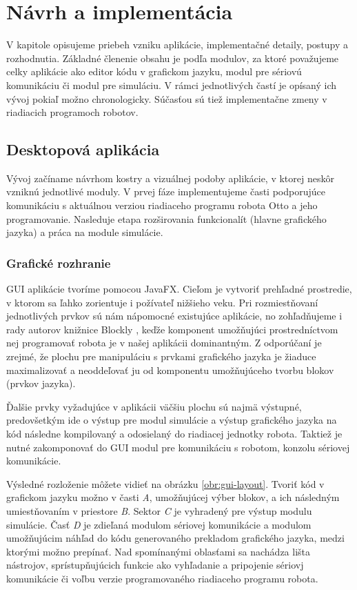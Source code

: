 \chapter{Návrh a implementácia}
\label{kap:implementacia}

V kapitole opisujeme priebeh vzniku aplikácie, implementačné detaily, postupy a rozhodnutia. Základné členenie obsahu je podľa modulov, za ktoré považujeme celky aplikácie ako editor kódu v grafickom jazyku, modul pre sériovú komunikáciu či modul pre simuláciu. V rámci jednotlivých častí je opísaný ich vývoj pokiaľ možno chronologicky. Súčasťou sú tiež implementačne zmeny v riadiacich programoch robotov.

\section{Desktopová aplikácia}
Vývoj začíname návrhom kostry a vizuálnej podoby aplikácie, v ktorej neskôr vzniknú jednotlivé moduly. V prvej fáze implementujeme časti podporujúce komunikáciu s aktuálnou verziou riadiaceho programu robota Otto a jeho programovanie. Nasleduje etapa rozširovania funkcionalít (hlavne grafického jazyka)  a práca na module simulácie.


\subsection{Grafické rozhranie}
GUI aplikácie tvoríme pomocou JavaFX. Cieľom je vytvoriť prehľadné prostredie, v ktorom sa ľahko zorientuje i požívateľ nižšieho veku. Pri rozmiestňovaní jednotlivých prvkov sú nám nápomocné existujúce aplikácie, no zohľadňujeme i rady autorov knižnice Blockly \cite{blocklyBestPractices}, keďže komponent umožňujúci prostredníctvom nej programovať robota je v našej aplikácii dominantným. Z odporúčaní je zrejmé, že plochu pre manipuláciu s prvkami grafického jazyka je žiaduce maximalizovať a neoddeľovať ju od komponentu umožňujúceho tvorbu blokov (prvkov jazyka).

Ďalšie prvky vyžadujúce v aplikácii väčšiu plochu sú najmä výstupné, predovšetkým ide o výstup pre modul simulácie a výstup  grafického jazyka na kód následne kompilovaný a odosielaný do riadiacej jednotky robota. Taktiež je nutné zakomponovať do GUI modul pre komunikáciu s robotom, konzolu sériovej komunikácie.

Výsledné rozloženie môžete vidieť na obrázku \ref{obr:gui-layout}. Tvoriť kód v grafickom jazyku možno v časti \textit{A}, umožňujúcej výber blokov, a ich následným umiestňovaním v priestore \textit{B}. Sektor \textit{C} je vyhradený pre výstup modulu simulácie. Časť \textit{D} je zdieľaná modulom sériovej komunikácie a modulom umožňujúcim náhľad do kódu generovaného prekladom grafického jazyka, medzi ktorými možno prepínať. Nad spomínanými oblasťami sa nachádza lišta nástrojov, sprístupňujúcich funkcie ako vyhľadanie a pripojenie sériovj komunikácie či voľbu verzie programovaného riadiaceho programu robota.

